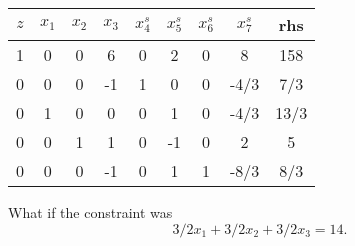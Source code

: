 \begin{center} \begin{tabular} {|c|c|c|c|c|c|c|c|c|} \hline  
$z$ & $x_1$ & $x_2$ & $x_3$ & $x^s_4$ & $x^s_5$ & $x^s_6$ &  $x^s_7$  & rhs   \\ \hline
\hline  1  & 0     & 0     & 6      & 0    & 2     & 0     & 8       & 158   \\
\hline  0  & 0     & 0     & -1   & 1    & 0  & 0     & -4/3       & 7/3     \\
\hline  0  & 1     & 0     & 0    & 0    & 1   & 0     & -4/3     & 13/3    \\
\hline  0  & 0     & 1     & 1    & 0    & -1   & 0     & 2       & 5     \\
\hline  0  & 0     & 0     & -1    & 0    & 1  & 1     & -8/3    & 8/3  \\ \hline
\end{tabular} \end{center}

What if the constraint was $$3/2 x_1 + 3/2x_2 + 3/2x_3 = 14.$$


